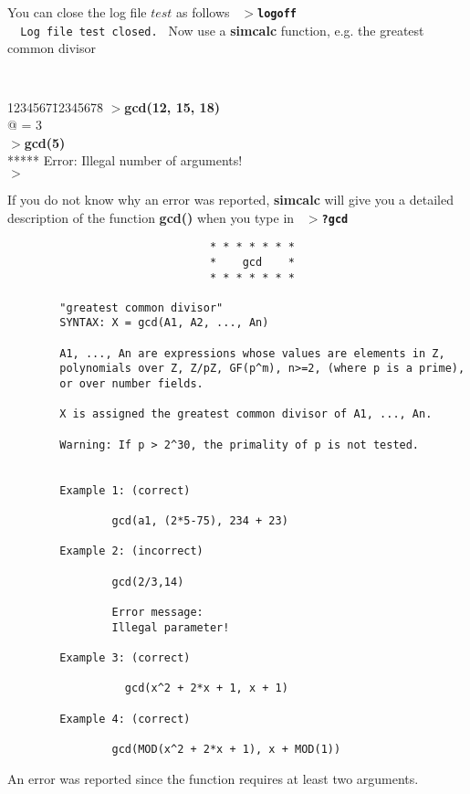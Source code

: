 You can close the log file $test$ as follows
\leer
{\tt
  $>${\bf logoff}\ \  \care\\
  \ \ Log file test closed.
}
\leer
Now use a {\bf simcalc} function, e.g.\/ the greatest common divisor
\leer
{\tt
  \begin{tabbing}
  1234567\=12345678\=\kill
  $>${\bf gcd(12, 15, 18)} \care\\
  \> @ = 3\\
  $>${\bf gcd(5)}\\
  ***** Error: Illegal number of arguments!\\
  $>$
  \end{tabbing}
}
\leer
If you do not know why an error was reported, {\bf simcalc} will give
you a detailed description of the function {\bf gcd()} when you type in
\leer
{\tt
  $>${\bf ?gcd }\care
}
\begin{verbatim}
                               * * * * * * *
                               *    gcd    *
                               * * * * * * *

        "greatest common divisor"
        SYNTAX: X = gcd(A1, A2, ..., An)

        A1, ..., An are expressions whose values are elements in Z,
        polynomials over Z, Z/pZ, GF(p^m), n>=2, (where p is a prime),
        or over number fields.

        X is assigned the greatest common divisor of A1, ..., An.

        Warning: If p > 2^30, the primality of p is not tested.


        Example 1: (correct)

                gcd(a1, (2*5-75), 234 + 23)

        Example 2: (incorrect)

                gcd(2/3,14)
 
                Error message:
                Illegal parameter!

        Example 3: (correct)

                  gcd(x^2 + 2*x + 1, x + 1)

        Example 4: (correct)

                gcd(MOD(x^2 + 2*x + 1), x + MOD(1))
\end{verbatim}

\newpage

An error was reported since the function requires at least two arguments.

